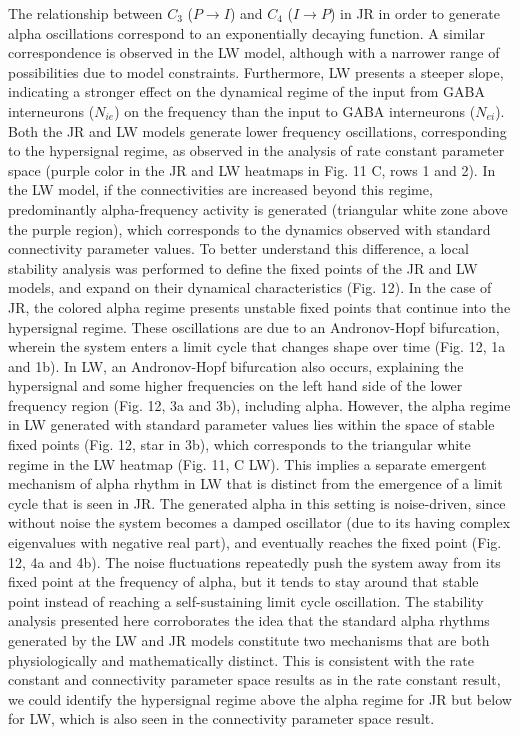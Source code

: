 \documentclass[12pt,twoside]{article}
\begin{document}
The relationship between $C_{3}$ ($P \rightarrow I$) and $C_{4}$ ($I \rightarrow P$) in JR in order to generate alpha oscillations correspond to an exponentially decaying function. A similar correspondence is observed in the LW model, although with a narrower range of possibilities due to model constraints. Furthermore, LW presents a steeper slope, indicating a stronger effect on the dynamical regime of the input from GABA interneurons ($N_{ie}$) on the frequency than the input to GABA interneurons ($N_{ei}$).
Both the JR and LW models generate lower frequency oscillations, corresponding to the hypersignal regime, as observed in the analysis of rate constant parameter space (purple color in the JR and LW heatmaps in Fig. 11 C, rows 1 and 2). In the LW model, if the connectivities are increased beyond this regime, predominantly alpha-frequency activity is generated (triangular white zone above the purple region), which corresponds to the dynamics observed with standard connectivity parameter values. To better understand this difference, a local stability analysis was performed to define the fixed points of the JR and LW models, and expand on their dynamical characteristics (Fig. 12). In the case of JR, the colored alpha regime presents unstable fixed points that continue into the hypersignal regime. These oscillations are due to an Andronov-Hopf bifurcation, wherein the system enters a limit cycle that changes shape over time (Fig. 12, 1a and 1b). In LW, an Andronov-Hopf bifurcation also occurs, explaining the hypersignal and some higher frequencies on the left hand side of the lower frequency region (Fig. 12, 3a and 3b), including alpha. However, the alpha regime in LW generated with standard parameter values lies within the space of stable fixed points (Fig. 12, star in 3b), which corresponds to the triangular white regime in the LW heatmap (Fig. 11, C LW). This implies a separate emergent mechanism of alpha rhythm in LW that is distinct from the emergence of a limit cycle that is seen in JR. The generated alpha in this setting is noise-driven, since without noise the system becomes a damped oscillator (due to its having complex eigenvalues with negative real part), and eventually reaches the fixed point (Fig. 12, 4a and 4b). The noise fluctuations repeatedly push the system away from its fixed point at the frequency of alpha, but it tends to stay around that stable point instead of reaching a self-sustaining limit cycle oscillation. 
The stability analysis presented here corroborates the idea that the standard alpha rhythms generated by the LW and JR models constitute two mechanisms that are both physiologically and mathematically distinct. This is consistent with the rate constant and connectivity parameter space results as in the rate constant result, we could identify the hypersignal regime above the alpha regime for JR but below for LW, which is also seen in the connectivity parameter space result.
\end{document}
